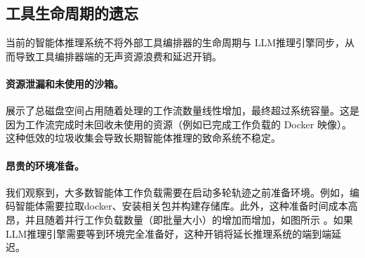 \subsection{工具生命周期的遗忘}
\label{sec:Tool mismanagement}
当前的智能体推理系统不将外部工具编排器的生命周期与 LLM推理引擎同步，从而导致工具编排器端的无声资源浪费和延迟开销。

\paragraph{资源泄漏和未使用的沙箱。}
\vspace{-2mm}
 展示了总磁盘空间占用随着处理的工作流数量线性增加，最终超过系统容量。这是因为工作流完成时未回收未使用的资源（例如已完成工作负载的 Docker 映像）。这种低效的垃圾收集会导致长期智能体推理的致命系统不稳定。

\paragraph{昂贵的环境准备。}
我们观察到，大多数智能体工作负载需要在启动多轮轨迹之前准备环境。例如，编码智能体需要拉取docker、安装相关包并构建存储库。此外，这种准备时间成本高昂，并且随着并行工作负载数量（即批量大小）的增加而增加，如图所示 。如果 LLM推理引擎需要等到环境完全准备好，这种开销将延长推理系统的端到端延迟。




